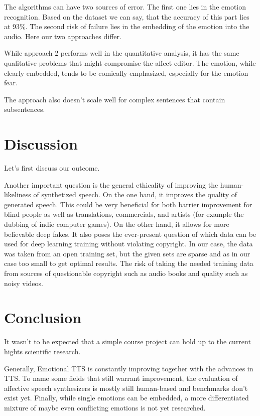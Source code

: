 \documentclass[11pt]{article}
\begin{document}
The algorithms can have two sources of error. The first one lies in the emotion recognition. Based on the \cite{saravia-etal-2018-carer} dataset we can say, that the accuracy of this part lies at 93\%. The second risk of failure lies in the embedding of the emotion into the audio. Here our two approaches differ.


While approach 2 performs well in the quantitative analysis, it has the same qualitative problems that might compromise the affect editor. The emotion, while clearly embedded, tends to be comically emphasized, especially for the emotion fear.

The approach also doesn't scale well for complex sentences that contain subsentences.
\section{Discussion}
\label{discussion}
Let's first discuss our outcome.

Another important question is the general ethicality of improving the human-likeliness of synthetized speech. On the one hand, it improves the quality of generated speech. This could be very beneficial for both barrier improvement for blind people as well as translations, commercials, and artists (for example the dubbing of indie computer games). On the other hand, it allows for more believable deep fakes. It also poses the ever-present question of which data can be used for deep learning training without violating copyright. In our case, the data was taken from an open training set, but the given sets are sparse and as in our case too small to get optimal results\cite{he_improve_2022}. The risk of taking the needed training data from sources of questionable copyright such as audio books and quality such as noisy videos.

\section{Conclusion}
\label{conclusion}
It wasn't to be expected that a simple course project can hold up to the current hights scientific research.

Generally, Emotional TTS is constantly improving together with the advances in TTS. To name some fields that still warrant improvement, the evaluation of affective speech synthesizers is mostly still human-based and benchmarks don't exist yet. Finally, while single emotions can be embedded, a more differentiated mixture of maybe even conflicting emotions is not yet researched.
\end{document}
